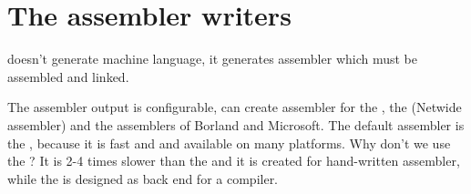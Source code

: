 \documentclass{report}
\begin{document}
\label{ch:parse_tree}

\label{ch:parser}

\label{ch:semantical_analysis}

\label{ch:code_generation}

\chapter{The assembler writers}
\label{ch:assembler_writers}

\fpc doesn't generate machine language, it generates
assembler which must be assembled and linked.

The assembler output is configurable, \fpc can create
assembler for the , the  (Netwide assembler) and
the assemblers of Borland and Microsoft. The default assembler
is the , because it is fast and and available on
many platforms. Why don't we use the ? It is 2-4 times
slower than the  and it is created for
hand-written assembler, while the  is designed
as back end for a compiler.
\end{document}
